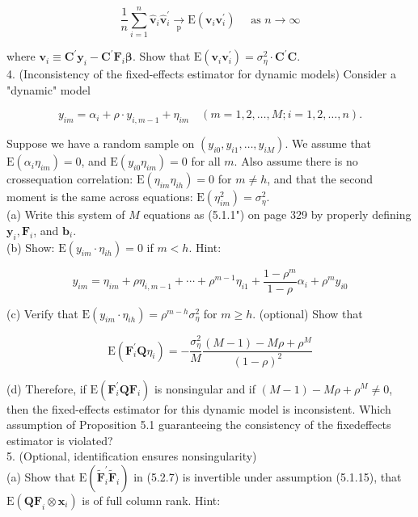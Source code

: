 \documentclass[10pt]{article}
\begin{document}
$$
\frac{1}{n} \sum_{i=1}^{n} \hat{\mathbf{v}}_{i} \hat{\mathbf{v}}_{i}^{\prime} \underset{\mathrm{p}}{\rightarrow} \mathrm{E}\left(\mathbf{v}_{i} \mathbf{v}_{i}^{\prime}\right) \quad \text { as } n \rightarrow \infty
$$

where $\mathbf{v}_{i} \equiv \mathbf{C}^{\prime} \mathbf{y}_{i}-\mathbf{C}^{\prime} \mathbf{F}_{i} \boldsymbol{\beta}$. Show that $\mathrm{E}\left(\mathbf{v}_{i} \mathbf{v}_{i}^{\prime}\right)=\sigma_{\eta}^{2} \cdot \mathbf{C}^{\prime} \mathbf{C}$.\\
4. (Inconsistency of the fixed-effects estimator for dynamic models) Consider a "dynamic" model

$$
y_{i m}=\alpha_{i}+\rho \cdot y_{i, m-1}+\eta_{i m} \quad(m=1,2, \ldots, M ; i=1,2, \ldots, n) .
$$

Suppose we have a random sample on $\left(y_{i 0}, y_{i 1}, \ldots, y_{i M}\right)$. We assume that $\mathrm{E}\left(\alpha_{i} \eta_{i m}\right)=0$, and $\mathrm{E}\left(y_{i 0} \eta_{i m}\right)=0$ for all $m$. Also assume there is no crossequation correlation: $\mathrm{E}\left(\eta_{i m} \eta_{i h}\right)=0$ for $m \neq h$, and that the second moment is the same across equations: $\mathrm{E}\left(\eta_{i m}^{2}\right)=\sigma_{\eta}^{2}$.\\
(a) Write this system of $M$ equations as (5.1.1") on page 329 by properly defining $\mathbf{y}_{i}, \mathbf{F}_{i}$, and $\mathbf{b}_{i}$.\\
(b) Show: $\mathrm{E}\left(y_{i m} \cdot \eta_{i h}\right)=0$ if $m<h$. Hint:

$$
y_{i m}=\eta_{i m}+\rho \eta_{i, m-1}+\cdots+\rho^{m-1} \eta_{i 1}+\frac{1-\rho^{m}}{1-\rho} \alpha_{i}+\rho^{m} y_{i 0}
$$

(c) Verify that $\mathrm{E}\left(y_{i m} \cdot \eta_{i h}\right)=\rho^{m-h} \sigma_{\eta}^{2}$ for $m \geq h$. (optional) Show that

$$
\mathrm{E}\left(\mathbf{F}_{i}^{\prime} \mathbf{Q} \eta_{i}\right)=-\frac{\sigma_{\eta}^{2}}{M} \frac{(M-1)-M \rho+\rho^{M}}{(1-\rho)^{2}}
$$

(d) Therefore, if $\mathrm{E}\left(\mathbf{F}_{i}^{\prime} \mathbf{Q} \mathbf{F}_{i}\right)$ is nonsingular and if $(M-1)-M \rho+\rho^{M} \neq 0$, then the fixed-effects estimator for this dynamic model is inconsistent. Which assumption of Proposition 5.1 guaranteeing the consistency of the fixedeffects estimator is violated?\\
5. (Optional, identification ensures nonsingularity)\\
(a) Show that $\mathrm{E}\left(\widetilde{\mathbf{F}}_{i}^{\prime} \widetilde{\mathbf{F}}_{i}\right)$ in (5.2.7) is invertible under assumption (5.1.15), that $\mathrm{E}\left(\mathbf{Q F}_{i} \otimes \mathbf{x}_{i}\right)$ is of full column rank. Hint:
\end{document}
